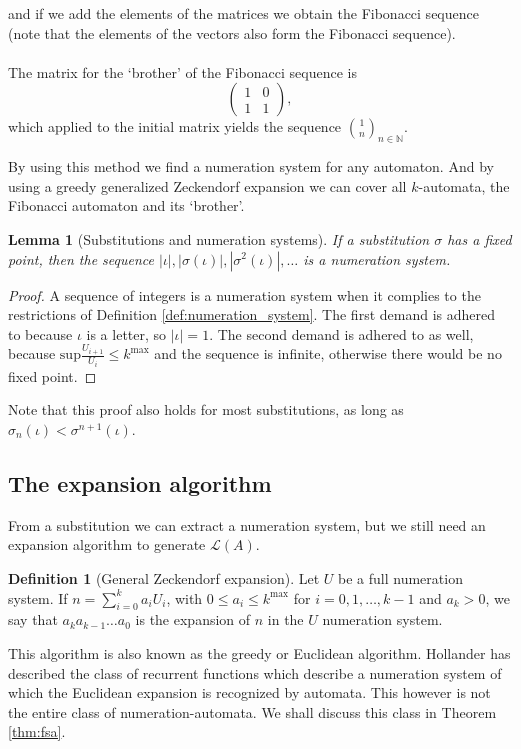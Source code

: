 \documentclass{article}
\newtheorem{lemma}[theorem]{Lemma}
\theoremstyle{definition}
\newtheorem{definition}[theorem]{Definition}
\begin{document}
and if we add the elements of the matrices we obtain the Fibonacci sequence 
(note that the elements of the vectors also form the Fibonacci sequence).\\
\\
The matrix for the `brother' of the Fibonacci sequence is
\begin{displaymath} \left( \begin{array}{cc}
1 & 0\\
1 & 1
\end{array} \right), \end{displaymath}
which applied to the initial matrix yields the sequence 
${1 \choose n}_{n \in \mathbb{N}}$.

By using this method we find a numeration system for any automaton. And by 
using a greedy generalized Zeckendorf expansion we can cover all $k$-automata, 
the Fibonacci automaton and its `brother'.

\begin{lemma}[Substitutions and numeration systems] \label{lem:subst-numsys}
If a substitution $\sigma$ has a fixed point, then the sequence
$|\iota|, |\sigma(\iota)|, |\sigma^2(\iota)|, \ldots$ is a numeration system.
\end{lemma}

\begin{proof}
A sequence of integers is a numeration system when it complies to the 
restrictions of Definition \ref{def:numeration_system}. The first demand is 
adhered to because $\iota$ is a letter, so $|\iota| = 1$. The second demand
is adhered to as well, because 
$\mathrm{sup}\frac{U_{i + 1}}{U_i} \le k^{\mathrm{max}}$ and the sequence is 
infinite, otherwise there would be no fixed point.
\end{proof}

Note that this proof also holds for most substitutions, as long as 
$\sigma_n(\iota) < \sigma^{n + 1}(\iota)$.

\subsection{The expansion algorithm} \label{sec:ea}
From a substitution we can extract a numeration system, but we still need an
expansion algorithm to generate $\mathcal{L}(A)$. 

\begin{definition}[General Zeckendorf expansion] \label{def:greedy}
Let $U$ be a full numeration system. If 
$n = \sum_{i = 0}^k a_i U_i$, with 
$0 \le a_i \le k^{\mathrm{max}}$ for $i = 0, 1, \ldots, k - 1$ and 
$a_k > 0$, we say that $a_k a_{k - 1} \ldots a_0$ is the expansion of
$n$ in the $U$ numeration system.
\end{definition}
This algorithm is also known as the greedy or Euclidean algorithm. Hollander 
\cite{Hol} has described the class of recurrent functions which describe a 
numeration system of which the Euclidean expansion is recognized by automata. 
This however is not the entire class of numeration-automata. We shall discuss 
this class in Theorem \ref{thm:fsa}.
\end{document}

